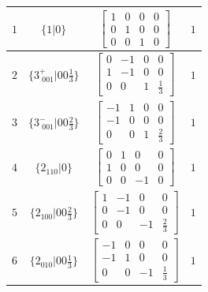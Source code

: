 \documentclass[fleqn,8pt]{jsarticle}
\begin{document}
\begin{longtable}{cccc}
$ 1 $ & $ \{1|0\} $ & $ \begin{bmatrix} 1 & 0 & 0 & 0 \\ 0 & 1 & 0 & 0 \\ 0 & 0 & 1 & 0 \end{bmatrix} $ & $ 1 $ \\ \hline
$ 2 $ & $ \{3^{+}_{\,\,001}|0 0 \frac{1}{3}\} $ & $ \begin{bmatrix} 0 & -1 & 0 & 0 \\ 1 & -1 & 0 & 0 \\ 0 & 0 & 1 & \frac{1}{3} \end{bmatrix} $ & $ 1 $ \\ \hline
$ 3 $ & $ \{3^{-}_{\,\,001}|0 0 \frac{2}{3}\} $ & $ \begin{bmatrix} -1 & 1 & 0 & 0 \\ -1 & 0 & 0 & 0 \\ 0 & 0 & 1 & \frac{2}{3} \end{bmatrix} $ & $ 1 $ \\ \hline
$ 4 $ & $ \{2{}_{110}|0\} $ & $ \begin{bmatrix} 0 & 1 & 0 & 0 \\ 1 & 0 & 0 & 0 \\ 0 & 0 & -1 & 0 \end{bmatrix} $ & $ 1 $ \\ \hline
$ 5 $ & $ \{2{}_{100}|0 0 \frac{2}{3}\} $ & $ \begin{bmatrix} 1 & -1 & 0 & 0 \\ 0 & -1 & 0 & 0 \\ 0 & 0 & -1 & \frac{2}{3} \end{bmatrix} $ & $ 1 $ \\ \hline
$ 6 $ & $ \{2{}_{010}|0 0 \frac{1}{3}\} $ & $ \begin{bmatrix} -1 & 0 & 0 & 0 \\ -1 & 1 & 0 & 0 \\ 0 & 0 & -1 & \frac{1}{3} \end{bmatrix} $ & $ 1 $ \\
\end{longtable}
\end{document}
